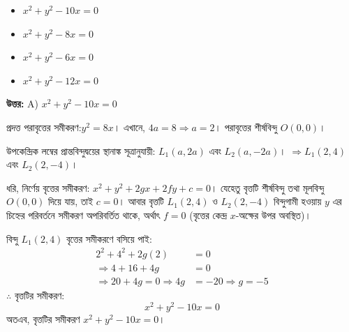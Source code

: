 \documentclass[12pt, a4paper]{article}
\begin{document}
\vspace{1em}
\begin{itemize}[label={}, leftmargin=1cm, itemsep=0.5em]
    \item[\textbf{A)}] $x^2 + y^2 - 10x = 0$
    \item[\textbf{B)}] $x^2 + y^2 - 8x = 0$
    \item[\textbf{C)}] $x^2 + y^2 - 6x = 0$
    \item[\textbf{D)}] $x^2 + y^2 - 12x = 0$
\end{itemize}

\vspace{0.5em}
\begin{tcolorbox}[answerbox]
    \textbf{\color{success} উত্তর:} A) $x^2 + y^2 - 10x = 0$
\end{tcolorbox}
\vspace{1em}

\begin{tcolorbox}[solutionbox={সমাধান (Solution)}]
    \noindent
    প্রদত্ত পরাবৃত্তের সমীকরণ:$y^2 = 8x$। 
    এখানে, $4a = 8 \Rightarrow a = 2$। পরাবৃত্তের শীর্ষবিন্দু $O(0, 0)$। 
    
    উপকেন্দ্রিক লম্বের প্রান্তবিন্দুদ্বয়ের স্থানাঙ্ক সূত্রানুযায়ী: $L_1(a, 2a)$ এবং $L_2(a, -2a)$। 
    $\Rightarrow L_1(2, 4)$ এবং  $L_2(2, -4)$। 
    
    ধরি, নির্ণেয় বৃত্তের সমীকরণ: $x^2 + y^2 + 2gx + 2fy + c = 0$। 
    যেহেতু বৃত্তটি শীর্ষবিন্দু তথা মূলবিন্দু $O(0, 0)$ দিয়ে যায়, তাই $c = 0$। 
    আবার বৃত্তটি $L_1(2, 4)$ ও $L_2(2, -4)$ বিন্দুগামী হওয়ায় $y$ এর চিহ্নের পরিবর্তনে সমীকরণ অপরিবর্তিত থাকে, অর্থাৎ  $f = 0$ (বৃত্তের কেন্দ্র $x$-অক্ষের উপর অবস্থিত)। 
    
    বিন্দু $L_1(2, 4)$ বৃত্তের সমীকরণে বসিয়ে পাই:
    \begin{align*}
        2^2 + 4^2 + 2g(2) &= 0 \\
        \Rightarrow 4 + 16 + 4g &= 0 \\
        \Rightarrow 20 + 4g = 0 \Rightarrow 4g &= -20 \Rightarrow g = -5
    \end{align*}
    $\therefore$ বৃত্তটির সমীকরণ: 
    \[ x^2 + y^2 - 10x = 0 \]
    অতএব, বৃত্তটির সমীকরণ \textbf{$x^2 + y^2 - 10x = 0$}।
\end{tcolorbox}

\vspace{2em}
\end{document}
